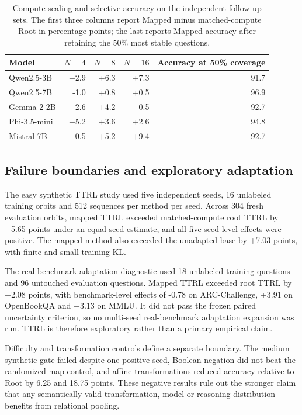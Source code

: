 \documentclass[11pt]{article}
\begin{document}
\begin{table}[H]
\centering\small
\caption{Compute scaling and selective accuracy on the independent follow-up sets. The first three columns report Mapped minus matched-compute Root in percentage points; the last reports Mapped accuracy after retaining the 50\% most stable questions.}
\label{tab:scaling}
\begin{tabular}{lrrrr}
\toprule
Model & $N=4$ & $N=8$ & $N=16$ & Accuracy at 50\% coverage \\
\midrule
Qwen2.5-3B & +2.9 & +6.3 & +7.3 & 91.7 \\
Qwen2.5-7B & -1.0 & +0.8 & +0.5 & 96.9 \\
Gemma-2-2B & +2.6 & +4.2 & -0.5 & 92.7 \\
Phi-3.5-mini & +5.2 & +3.6 & +2.6 & 94.8 \\
Mistral-7B & +0.5 & +5.2 & +9.4 & 92.7 \\
\bottomrule
\end{tabular}
\end{table}

\subsection{Failure boundaries and exploratory adaptation}

The easy synthetic TTRL study used five independent seeds, 16 unlabeled training orbits and 512 sequences per method per seed. Across 304 fresh evaluation orbits, mapped TTRL exceeded matched-compute root TTRL by +5.65 points under an equal-seed estimate, and all five seed-level effects were positive. The mapped method also exceeded the unadapted base by +7.03 points, with finite and small training KL.

The real-benchmark adaptation diagnostic used 18 unlabeled training questions and 96 untouched evaluation questions. Mapped TTRL exceeded root TTRL by +2.08 points, with benchmark-level effects of -0.78 on ARC-Challenge, +3.91 on OpenBookQA and +3.13 on MMLU. It did not pass the frozen paired uncertainty criterion, so no multi-seed real-benchmark adaptation expansion was run. TTRL is therefore exploratory rather than a primary empirical claim.

Difficulty and transformation controls define a separate boundary. The medium synthetic gate failed despite one positive seed, Boolean negation did not beat the randomized-map control, and affine transformations reduced accuracy relative to Root by 6.25 and 18.75 points. These negative results rule out the stronger claim that any semantically valid transformation, model or reasoning distribution benefits from relational pooling.
\end{document}
